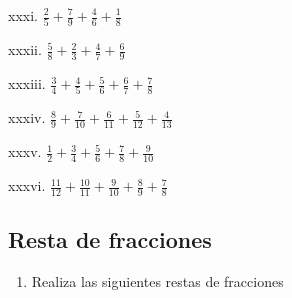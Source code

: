 \documentclass[]{book}
\providecommand{\tightlist}{%
  \setlength{\itemsep}{0pt}\setlength{\parskip}{0pt}}
\begin{document}
\begin{multicols}{2}
    xxxi. $\frac{2}{5} + \frac{7}{9} + \frac{4}{6} + \frac{1}{8}$
  
    xxxii. $\frac{5}{8} + \frac{2}{3} + \frac{4}{7} + \frac{6}{9}$
  
    xxxiii. $\frac{3}{4} + \frac{4}{5} + \frac{5}{6} + \frac{6}{7} + \frac{7}{8}$
  
    xxxiv. $\frac{8}{9} + \frac{7}{10} + \frac{6}{11} + \frac{5}{12} + \frac{4}{13}$
  
    xxxv. $\frac{1}{2} + \frac{3}{4} + \frac{5}{6} + \frac{7}{8} + \frac{9}{10}$
  
    xxxvi. $\frac{11}{12} + \frac{10}{11} + \frac{9}{10} + \frac{8}{9} + \frac{7}{8}$
\end{multicols}

\subsection{Resta de fracciones}\label{resta-de-fracciones}

\begin{enumerate}
\def\labelenumi{\arabic{enumi}.}
\setcounter{enumi}{1}
\tightlist
\item
  Realiza las siguientes restas de fracciones
\end{enumerate}
\end{document}
